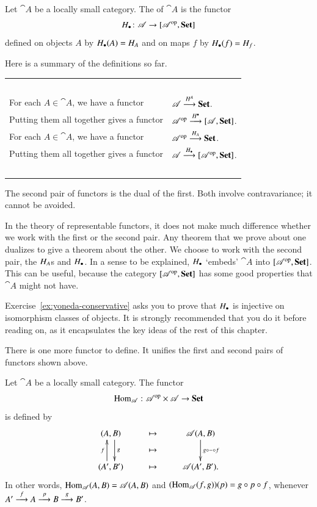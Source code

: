 \begin{defn}
\label{defn:yon-emb}
Let $\cat{A}$ be a locally small category.  The  of $\cat{A}$ is the functor
\[
\h_\bl\from \cat{A} \to \ftrcat{\cat{A}^\op}{\Set}%
%
\ntn{hom-in-blank}
%
\]
defined on objects $A$ by $H_\bullet(A) = H_A$ and on maps $f$ by $H_\bullet(f) =
H_f$.
\end{defn}

Here is a summary of the definitions so far.
%
\begin{center}
\begin{tabular}{ll}
\ \\[-2ex]
For each $A \in \cat{A}$, we have a functor     &
$\mathscr{A} \stackrel{H^A}{\longrightarrow} \mathbf{Set}$. \\
Putting them all together gives a functor       &
$\mathscr{A}^{\mathrm{op}} \stackrel{H^\bullet}{\longrightarrow} [\mathscr{A},\mathbf{Set}]$.
\vspace*{2ex}\\
For each $A \in \cat{A}$, we have a functor     &
$\mathscr{A}^{\mathrm{op}} \stackrel{H_A}{\longrightarrow} \mathbf{Set}$. \\
Putting them all together gives a functor       &
$\mathscr{A} \stackrel{H_\bullet}{\longrightarrow} [\mathscr{A}^{\mathrm{op}},\mathbf{Set}]$.\\[-2ex]
\
\end{tabular}%
\end{center}
%
The second pair of functors is the dual of the first.  Both involve
contravariance;%
%
%
%
it cannot be avoided.

In the theory of representable functors, it does not make much difference
whether we work with the first or the second pair.  Any theorem that we
prove about one dualizes to give a theorem about the other.  We choose to
work with the second pair, the $H_A$s and $H_\bullet$.  In a sense to be
explained, $H_\bullet$ `embeds' $\cat{A}$ into $[\mathscr{A}^{\mathrm{op}},\mathbf{Set}]$.
This can be useful, because the category $[\mathscr{A}^{\mathrm{op}},\mathbf{Set}]$ has
some good properties that $\cat{A}$ might not have.

Exercise~\ref{ex:yoneda-conservative} asks you to prove that $H_\bullet$ is
injective on isomorphism classes of objects.  It is strongly recommended
that you do it before reading on, as it encapsulates the key ideas of the
rest of this chapter.

There is one more functor to define.  It unifies the first and second pairs
of functors shown above.

\begin{defn}
Let $\cat{A}$ be a locally small category.  The functor
\[
\Hom_\cat{A}\from \cat{A}^\op \times \cat{A} \to \Set%
%
\index{hom-set}
%
\ntn{Hom-functor}
%
\]
is defined by
\[
\xymatrix{
(A, B) \ar@<1ex>[d]^g    &
\mapsto \ar@{}[d]|*+{\mapsto}       &
\cat{A}(A, B) \ar[d]^{g \of \dashbk \of f}      \\
(A', B') \ar@<1ex>[u]^f  &
\mapsto &
\cat{A}(A', B').
}
\]
In other words, $\operatorname{Hom}_{\mathscr{A}}(A, B) = \mathscr{A}(A, B)$ and $(\operatorname{Hom}_{\mathscr{A}}(f,
g))(p) = g \mathbin{\circ} p \mathbin{\circ} f$, whenever $A' \stackrel{f}{\longrightarrow} A \stackrel{p}{\longrightarrow} B \stackrel{g}{\longrightarrow} B'$.
\end{defn}

